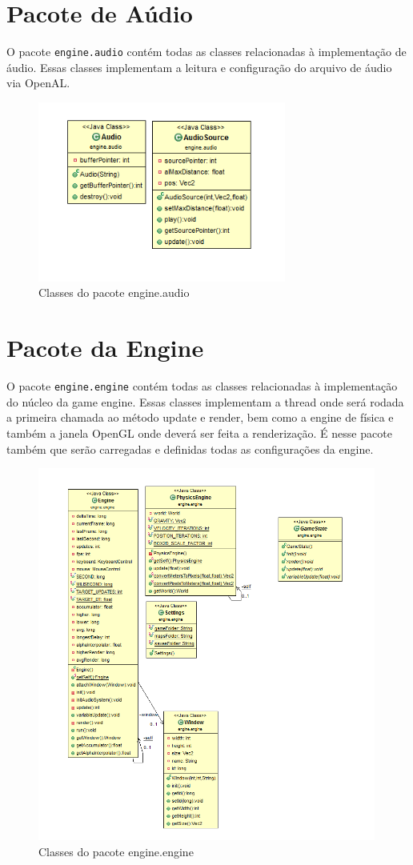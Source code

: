 \documentclass[12pt, 
openright, 
oneside, 
a4paper,    
brazil]{facom-ufu-abntex2}
\begin{document}
\section{Pacote de Aúdio}

O pacote \texttt{engine.audio} contém todas as classes relacionadas à implementação de áudio. Essas classes implementam a leitura e configuração do arquivo de áudio via OpenAL.

\begin{figure}[H]
	\centering
	\includegraphics[width=22em]{imagens/engine.audio.png}
	\caption{Classes do pacote engine.audio}
\end{figure}

\section{Pacote da Engine}

O pacote \texttt{engine.engine} contém todas as classes relacionadas à implementação do núcleo da game engine. Essas classes implementam a thread onde será rodada a primeira chamada ao método update e render, bem como a engine de física e também a janela OpenGL onde deverá ser feita a renderização. É nesse pacote também que serão carregadas e definidas todas as configurações da engine.

\begin{figure}[H]
	\centering
	\includegraphics[width=30em]{imagens/engine.engine.png}
	\caption{Classes do pacote engine.engine}
\end{figure}
\end{document}
